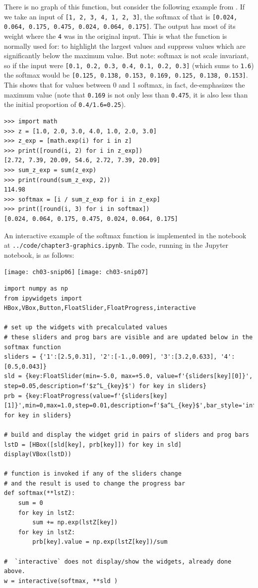 There is no graph of this function, but consider the following example from \cite{WikiPediaSoftmaxFunction2019}.
If we take an input of \lstinline{[1, 2, 3, 4, 1, 2, 3]}, the softmax of that is \lstinline{[0.024, 0.064, 0.175, 0.475, 0.024, 0.064, 0.175]}. The output has most of its weight where the \lstinline{4} was in the original input. This is what the function is normally used for: to highlight the largest values and suppress values which are significantly below the maximum value. But note: softmax is not scale invariant, so if the input were \lstinline{[0.1, 0.2, 0.3, 0.4, 0.1, 0.2, 0.3]} (which sums to \lstinline{1.6}) the softmax would be \lstinline{[0.125, 0.138, 0.153, 0.169, 0.125, 0.138, 0.153]}. This shows that for values between 0 and 1 softmax, in fact, de-emphasizes the maximum value (note that \lstinline{0.169} is not only less than \lstinline{0.475}, it is also less than the initial proportion of \lstinline{0.4/1.6=0.25}). 
\begin{lstlisting}
>>> import math
>>> z = [1.0, 2.0, 3.0, 4.0, 1.0, 2.0, 3.0]
>>> z_exp = [math.exp(i) for i in z]
>>> print([round(i, 2) for i in z_exp])
[2.72, 7.39, 20.09, 54.6, 2.72, 7.39, 20.09]
>>> sum_z_exp = sum(z_exp)
>>> print(round(sum_z_exp, 2))
114.98
>>> softmax = [i / sum_z_exp for i in z_exp]
>>> print([round(i, 3) for i in softmax])
[0.024, 0.064, 0.175, 0.475, 0.024, 0.064, 0.175]
\end{lstlisting}



An interactive example of the softmax function is implemented in the notebook at
\lstinline{../code/chapter3-graphics.ipynb}.  The code, running in the Jupyter notebook, is as follows:
\begin{marginfigure}[-80mm]
\texttt{[image: ch03-snip06]}
\texttt{[image: ch03-snip07]}
\end{marginfigure}
\begin{lstlisting}
import numpy as np
from ipywidgets import HBox,VBox,Button,FloatSlider,FloatProgress,interactive

# set up the widgets with precalculated values
# these sliders and prog bars are visible and are updated below in the softmax function
sliders = {'1':[2.5,0.31], '2':[-1.,0.009], '3':[3.2,0.633], '4':[0.5,0.043]}
sld = {key:FloatSlider(min=-5.0, max=+5.0, value=f'{sliders[key][0]}', step=0.05,description=f'$z^L_{key}$') for key in sliders}
prb = {key:FloatProgress(value=f'{sliders[key][1]}',min=0,max=1.0,step=0.01,description=f'$a^L_{key}$',bar_style='info',orientation='horizontal') for key in sliders}

# build and display the widget grid in pairs of sliders and prog bars
lstD = [HBox([sld[key], prb[key]]) for key in sld]
display(VBox(lstD))

# function is invoked if any of the sliders change
# and the result is used to change the progress bar
def softmax(**lstZ):
    sum = 0
    for key in lstZ:
        sum += np.exp(lstZ[key])
    for key in lstZ:
        prb[key].value = np.exp(lstZ[key])/sum

#  `interactive` does not display/show the widgets, already done above.
w = interactive(softmax, **sld )
\end{lstlisting}


